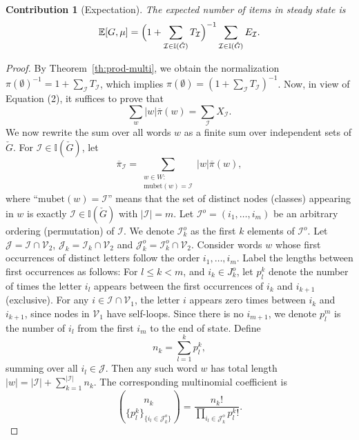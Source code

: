 \documentclass[11pt]{article}
\newtheorem{contribution}{Contribution}
\begin{document}
\begin{contribution}[Expectation]\label{cor:exp-multi}
The expected number of items in steady state is
\begin{equation}\label{eq:exp-multi}
\mathbb{E}[G,\mu]=\Bigl(1+\sum_{\mathcal{I}\in\mathbb{I}(\check G)}T_\mathcal{I}\Bigr)^{-1}\sum_{\mathcal{I}\in\mathbb{I}(\check G)}E_\mathcal{I}.
\end{equation}
\end{contribution}

\begin{proof}
	By Theorem~\ref{th:prod-multi}, we obtain the normalization $\pi(\emptyset)^{-1}=1+\sum_{\mathcal{I}}T_\mathcal{I}$, which implies $\pi(\emptyset)=(1+\sum_{\mathcal{I}}T_\mathcal{I})^{-1}$.  Now, in view of Equation (2), it suffices to prove that 
	$$\sum_{w}|w|\overline{\pi}(w)=\sum_{\mathcal{I}}X_\mathcal{I}.$$
	We now rewrite the sum over all words $w$ as a finite sum over independent sets of $\check{G}$.  For $\mathcal{I}\in\mathbb{I}(\check{G})$, let 
	$$
	\overline{\pi}_{\mathcal{I}} =\sum_{\substack{w\in W:\\ \mathrm{mubet}(w)=\mathcal{I}}} |w|\overline{\pi}(w),
	$$
	where “$\mathrm{mubet}(w)=\mathcal{I}$” means that the set of distinct nodes (classes) appearing in $w$ is exactly $\mathcal{I}\in\mathbb{I}(\check{G})$ with $|\mathcal{I}|=m$. Let $\mathcal{I}^o=(i_1,\dots,i_{m})$ be an arbitrary ordering (permutation) of $\mathcal{I}$. 
	We denote $\mathcal{I}_k^o$ as the first $k$ elements of $\mathcal{I}^o$. 
	Let $\mathcal{J}=\mathcal{I}\cap \mathcal{V}_2$, $\mathcal{J}_k=\mathcal{I}_k\cap \mathcal{V}_2$ and $\mathcal{J}_k^o=\mathcal{I}_k^o\cap \mathcal{V}_2$. Consider words $w$ whose first occurrences of distinct letters follow the order $i_1,\dots,i_{m}$.  
	Label the lengths between first occurrences as follows: For $l\leq k<m$, and $i_k \in J^o_k$, let $p_{l}^k$ denote the number of times the letter $i_l$ appears between the first occurrences of $i_k$ and $i_{k+1}$ (exclusive).
	For any $i\in\mathcal{I}\cap\mathcal{V}_1$, the letter $i$ appears zero times between $i_k$ and $i_{k+1}$, since nodes in $\mathcal{V}_1$ have self-loops.
	Since there is no $i_{m+1}$, we denote $p_l^m$ is the number of $i_l$ from the first $i_m$ to the end of state.
	Define $$n_k= \sum_{l=1}^{k} p_{l}^k,$$ summing over all $i_l \in \mathcal{J}$.
	Then any such word $w$ has total length 
	$|w|=|\mathcal{I}|+\sum_{k=1}^{|\mathcal{I}|} n_k$. 
	The corresponding multinomial coefficient is
	$$\binom{n_k}{\{p_l^k\}_{\{i_l\in\mathcal{J}_k^o\}}}=\frac{n_k!}{\prod_{i_l\in\mathcal{J}_k^o} {p_l^k}!}.$$

\end{proof}
\end{document}

